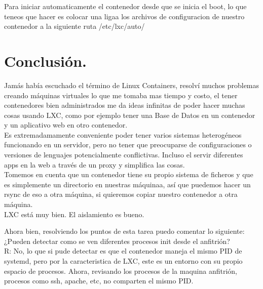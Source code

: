 \documentclass[1pt]{article} %
\begin{document}
Para iniciar automaticamente el contenedor desde que se inicia el boot, lo que teneos que hacer es colocar una ligaa los archivos de configuracion de nuestro contenedor a la siguiente ruta /etc/lxc/auto/

\begin{center}\end{center}

\section{Conclusión.}

Jamás había escuchado el término de Linux Containers, resolví muchos problemas creando máquinas virtuales lo que me tomaba mas tiempo y costo, el tener contenedores bien administrados me da ideas infinitas de poder hacer muchas cosas usando LXC, como por ejemplo tener una Base de Datos en un contenedor y un aplicativo web en otro contenedor. \\

Es extremadamamente conveniente poder tener varios sistemas heterogéneos funcionando en un servidor, pero no tener que preocuparse de configuraciones o versiones de lenguajes potencialmente conflictivas. Incluso el servir diferentes apps en la web a través de un proxy y simplifica las cosas. \\

Tomemos en cuenta que un contenedor tiene su propio sistema de ficheros y que es simplemente un directorio en nuestras máquinaa, así que puedemos hacer un rsync de eso a otra máquina, si quieremos copiar nuestro contenedor a otra máquina.\\

LXC está muy bien. El aislamiento es bueno.\\

\newpage

Ahora bien, resolviendo los puntos de esta tarea puedo comentar lo siguiente:\\

¿Pueden detectar como se ven diferentes procesos init desde el anfitrión?\\

R: No, lo que si pude detectar es que el contenedor maneja el mismo PID de systemd, pero por la caracteristica de LXC, este es un entorno con su propio espacio de procesos. Ahora, revisando los procesos de la maquina anfitrión, procesos como ssh, apache, etc, no comparten el mismo PID.\\
\end{document}
